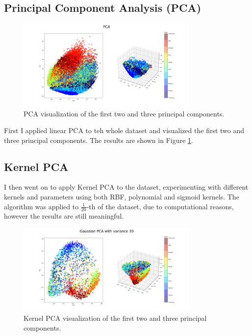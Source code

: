 \documentclass[a4paper, 10pt]{article}
\begin{document}
\subsection{Principal Component Analysis (PCA)}
\begin{figure}[ht]
    \centering
    \includegraphics[width=0.8\textwidth]{images/pca.png}
    \caption{PCA visualization of the first two and three principal components.}
    \label{fig:pca}
\end{figure}

First I applied linear PCA to teh whole dataset and visualized the first two and three principal components.
The results are shown in Figure \ref{fig:pca}.

\subsection{Kernel PCA}
I then went on to apply Kernel PCA to the dataset, experimenting with different kernels and parameters using both 
RBF, polynomial and sigmoid kernels. The algorithm was applied to $\frac{1}{20}$-th of the dataset, due to computational
reasons, however the results are still meaningful.

\begin{figure}[ht]
    \centering
    \includegraphics[width=0.8\textwidth]{images/kernel_pca.png}
    \caption{Kernel PCA visualization of the first two and three principal components.}
    \label{fig:kpca}
\end{figure}
\end{document}
